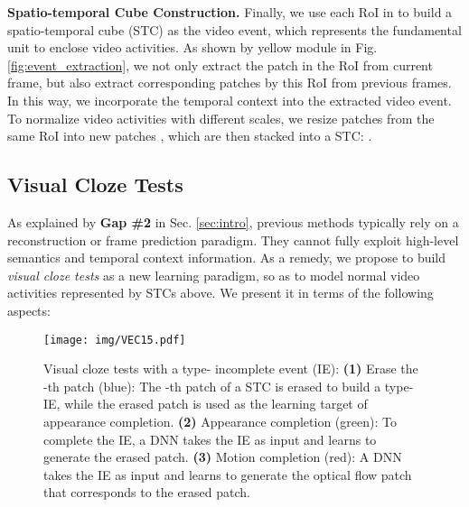 \documentclass[sigconf]{acmart}
\begin{document}
\textbf{Spatio-temporal Cube Construction.} Finally, we use each RoI in  to build a spatio-temporal cube (STC) as the video event, which represents the fundamental unit to enclose video activities. As shown by yellow module in Fig. \ref{fig:event_extraction}, we not only extract the patch  in the RoI from current frame, but also extract corresponding patches  by this RoI from previous  frames. In this way, we incorporate the temporal context into the extracted video event. To normalize video activities with different scales, we resize patches from the same RoI into  new patches , which are then stacked into a  STC: .

\subsection{Visual Cloze Tests}
As explained by \textbf{Gap \#2} in Sec. \ref{sec:intro}, previous methods typically rely on a reconstruction or frame prediction paradigm. They cannot fully exploit high-level semantics and temporal context information. As a remedy, we propose to build \textit{visual cloze tests} as a new learning paradigm, so as to model normal video activities represented by STCs above. We present it in terms of the following aspects:
\begin{figure*}
	\centering
	\texttt{[image: img/VEC15.pdf]}
	\caption{Visual cloze tests with a type- incomplete event (IE): \textbf{(1)} Erase the -th patch (blue): The -th patch of a STC is erased to build a type- IE, while the erased patch is used as the learning target of appearance completion. \textbf{(2)} Appearance completion (green): To complete the IE, a DNN takes the IE as input and learns to generate the erased patch. \textbf{(3)} Motion completion (red): A DNN takes the IE as input and learns to generate the optical flow patch that corresponds to the erased patch.}
	\label{fig:event_completion}
\end{figure*}
\end{document}
